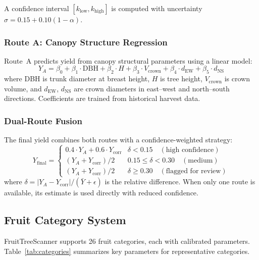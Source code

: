 \documentclass[article,final]{iclr2024_conference}
\newcommand{\theMethod}{FruitTreeScanner}
\begin{document}
A confidence interval $[k_{\text{low}}, k_{\text{high}}]$ is computed with uncertainty $\sigma = 0.15 + 0.10(1 - \alpha)$.

\subsubsection{Route A: Canopy Structure Regression}

Route~A predicts yield from canopy structural parameters using a linear model:
\begin{equation}
Y_A = \beta_0 + \beta_1 \cdot \text{DBH} + \beta_2 \cdot H + \beta_3 \cdot V_{\text{crown}} + \beta_4 \cdot d_{\text{EW}} + \beta_5 \cdot d_{\text{NS}}
\end{equation}
where DBH is trunk diameter at breast height, $H$ is tree height, $V_{\text{crown}}$ is crown volume, and $d_{\text{EW}}$, $d_{\text{NS}}$ are crown diameters in east--west and north--south directions. Coefficients are trained from historical harvest data.

\subsubsection{Dual-Route Fusion}

The final yield combines both routes with a confidence-weighted strategy:
\begin{equation}
Y_{\text{final}} = \begin{cases}
0.4 \cdot Y_A + 0.6 \cdot Y_{\text{corr}} & \delta < 0.15 \quad (\text{high confidence}) \\
(Y_A + Y_{\text{corr}})/2 & 0.15 \leq \delta < 0.30 \quad (\text{medium}) \\
(Y_A + Y_{\text{corr}})/2 & \delta \geq 0.30 \quad (\text{flagged for review})
\end{cases}
\end{equation}
where $\delta = |Y_A - Y_{\text{corr}}| / (\bar{Y} + \epsilon)$ is the relative difference. When only one route is available, its estimate is used directly with reduced confidence.

\subsection{Fruit Category System}
\label{sec:categories}

\theMethod{} supports 26 fruit categories, each with calibrated parameters. Table~\ref{tab:categories} summarizes key parameters for representative categories.
\end{document}

